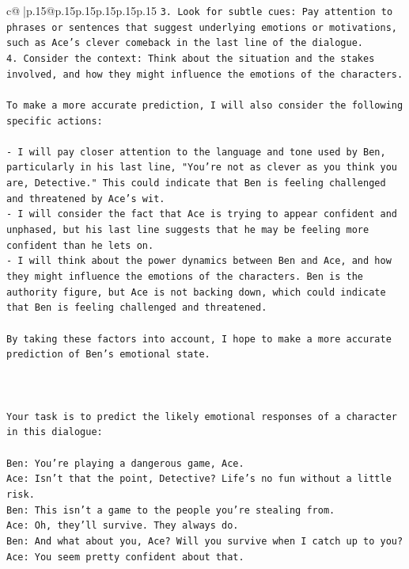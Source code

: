\documentclass{article}
\begin{document}
{\begin{supertabular}{c@{$\;$}|p{.15\linewidth}@{}p{.15\linewidth}p{.15\linewidth}p{.15\linewidth}p{.15\linewidth}p{.15\linewidth}}
{{{\texttt{3. Look for subtle cues: Pay attention to phrases or sentences that suggest underlying emotions or motivations, such as Ace's clever comeback in the last line of the dialogue.} \\
\texttt{4. Consider the context: Think about the situation and the stakes involved, and how they might influence the emotions of the characters.} \\
\\ 
\texttt{To make a more accurate prediction, I will also consider the following specific actions:} \\
\\ 
\texttt{{-} I will pay closer attention to the language and tone used by Ben, particularly in his last line, "You're not as clever as you think you are, Detective." This could indicate that Ben is feeling challenged and threatened by Ace's wit.} \\
\texttt{{-} I will consider the fact that Ace is trying to appear confident and unphased, but his last line suggests that he may be feeling more confident than he lets on.} \\
\texttt{{-} I will think about the power dynamics between Ben and Ace, and how they might influence the emotions of the characters. Ben is the authority figure, but Ace is not backing down, which could indicate that Ben is feeling challenged and threatened.} \\
\\ 
\texttt{By taking these factors into account, I hope to make a more accurate prediction of Ben's emotional state.} \\
\\ 
\\ 
\\ 
\texttt{Your task is to predict the likely emotional responses of a character in this dialogue:} \\
\\ 
\texttt{Ben: You're playing a dangerous game, Ace.} \\
\texttt{Ace: Isn't that the point, Detective? Life's no fun without a little risk.} \\
\texttt{Ben: This isn't a game to the people you're stealing from.} \\
\texttt{Ace: Oh, they'll survive. They always do.} \\
\texttt{Ben: And what about you, Ace? Will you survive when I catch up to you?} \\
\texttt{Ace: You seem pretty confident about that.} \\
}}}
\end{supertabular}}
\end{document}
